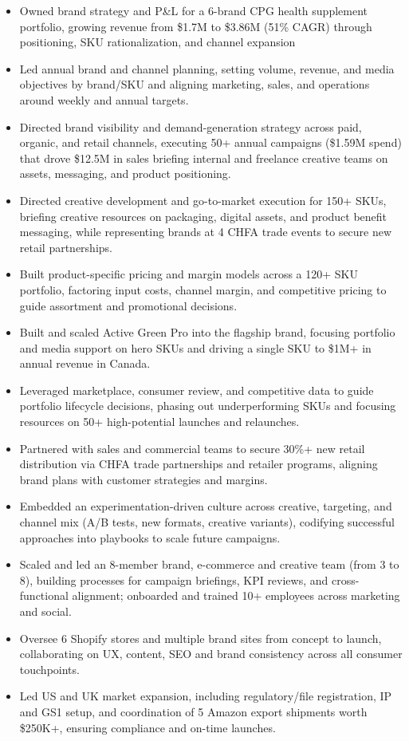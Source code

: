 \documentclass[10pt,letterpaper]{article}
\begin{document}
\begin{itemize}
\item Owned brand strategy and P\&L for a 6-brand CPG health supplement portfolio, growing revenue from \$1.7M to \$3.86M (51\% CAGR) through positioning, SKU rationalization, and channel expansion
\item Led annual brand and channel planning, setting volume, revenue, and media objectives by brand/SKU and aligning marketing, sales, and operations around weekly and annual targets.
\item Directed brand visibility and demand-generation strategy across paid, organic, and retail channels, executing 50+ annual campaigns (\$1.59M spend) that drove \$12.5M in sales briefing internal and freelance creative teams on assets, messaging, and product positioning.
\item Directed creative development and go-to-market execution for 150+ SKUs, briefing creative resources on packaging, digital assets, and product benefit messaging, while representing brands at 4 CHFA trade events to secure new retail partnerships.
\item Built product-specific pricing and margin models across a 120+ SKU portfolio, factoring input costs, channel margin, and competitive pricing to guide assortment and promotional decisions.
\item Built and scaled Active Green Pro into the flagship brand, focusing portfolio and media support on hero SKUs and driving a single SKU to \$1M+ in annual revenue in Canada.
\item Leveraged marketplace, consumer review, and competitive data to guide portfolio lifecycle decisions, phasing out underperforming SKUs and focusing resources on 50+ high-potential launches and relaunches.
\item Partnered with sales and commercial teams to secure 30\%+ new retail distribution via CHFA trade partnerships and retailer programs, aligning brand plans with customer strategies and margins.
\item Embedded an experimentation-driven culture across creative, targeting, and channel mix (A/B tests, new formats, creative variants), codifying successful approaches into playbooks to scale future campaigns.
\item Scaled and led an 8-member brand, e-commerce and creative team (from 3 to 8), building processes for campaign briefings, KPI reviews, and cross-functional alignment; onboarded and trained 10+ employees across marketing and social.
\item Oversee 6 Shopify stores and multiple brand sites from concept to launch, collaborating on UX, content, SEO and brand consistency across all consumer touchpoints.
\item Led US and UK market expansion, including regulatory/file registration, IP and GS1 setup, and coordination of 5 Amazon export shipments worth \$250K+, ensuring compliance and on-time launches.
\end{itemize}
\end{document}
